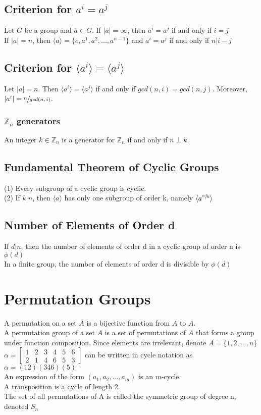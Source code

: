 \documentclass{article}
\begin{document}
\subsection{Criterion for $a^i = a^j$}
Let $G$ be a group and $a \in G$. If $|a| = \infty$, then $a^i = a^j$ if and only if $i = j$ \\
If $|a| = n$, then $\langle a \rangle = \{e, a^1, a^2, ..., a^{n-1}\}$ and $a^i=a^j$ if and only if $n | i-j$ 
\subsection{Criterion for $\langle a^i \rangle = \langle a^j \rangle$}
Let $|a| = n$. Then $\langle a^i\rangle = \langle a^j\rangle$ if and only if $gcd(n, i) = gcd(n, j)$. Moreover, $|a^i| = \sfrac{n}{gcd(n, i)}$.
\subsubsection{$\mathbb{Z}_n$ generators}
An integer $k \in \mathbb{Z}_n$ is a generator for $\mathbb{Z}_n$ if and only if $n \perp k$.
\subsection{Fundamental Theorem of Cyclic Groups}
(1) Every subgroup of a cyclic group is cyclic. \\
(2) If $k | n$, then $\langle  a\rangle$ has only one subgroup of order k, namely $\langle a^{\sfrac{n}{k}} \rangle$
\subsection{Number of Elements of Order d}
If $d|n$, then the number of elements of order d in a cyclic group of order n is $\phi(d)$ \\
In a finite group, the number of elements of order d is divisible by $\phi(d)$


\section{Permutation Groups}
A permutation on a set $A$ is a bijective function from $A$ to $A$. \\
A permutation group of a set $A$ is a set of permutations of $A$ that forms a group under function composition. Since elements are irrelevant, denote $A = \{1, 2, ..., n\} $ \\
$\alpha = \begin{bmatrix}
		1 & 2 & 3 & 4 & 5 & 6 \\
		2 & 1 & 4 & 6 & 5 & 3
		\end{bmatrix}$ can be written in cycle notation as $\alpha = (12)(346)(5)$ \\
An expression of the form $(a_1, a_2, ..., a_m)$ is an $m$-cycle. \\
A transposition is a cycle of length 2. \\
The set of all permutations of A is called the symmetric group of degree n, denoted $S_n$ 
\end{document}

